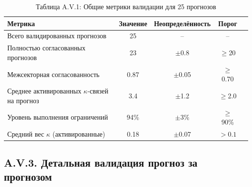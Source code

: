 \documentclass[11pt,a4paper]{article}
\begin{document}
	\begin{table}[H]
		\centering
		\small
		\caption{Таблица A.V.1: Общие метрики валидации для 25 прогнозов}
		\begin{tabular}{p{}cccc}
			\toprule
			\textbf{Метрика} & \textbf{Значение} & \textbf{Неопределённость} & \textbf{Порог} \\
			\midrule
			Всего валидированных прогнозов & 25 & -- & -- \\
			Полностью согласованных прогнозов & 23 & $\pm$0.8 & $\geq$20 \\
			Межсекторная согласованность & 0.87 & $\pm$0.05 & $\geq$0.70 \\
			Среднее активированных $\kappa$-связей на прогноз & 3.4 & $\pm$1.2 & $\geq$2.0 \\
			Уровень выполнения ограничений & 94\% & $\pm$3\% & $\geq$90\% \\
			Средний вес $\kappa$ (активированные) & 0.18 & $\pm$0.07 & $>0.1$ \\
			\bottomrule
		\end{tabular}
		\label{tab:validation-summary}
	\end{table}
	
	\subsection*{A.V.3. Детальная валидация прогноз за прогнозом}
	
\end{document}
